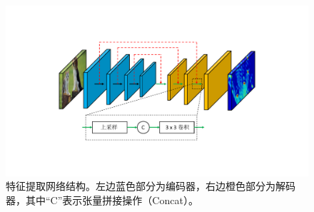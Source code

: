 \begin{figure}[t]
	\centering
	\includegraphics[trim={3cm, 3.5cm, 3cm, 3cm}, clip,width=\textwidth]{imgs/feature-extractor.pdf}
	\caption{特征提取网络结构。左边蓝色部分为编码器，右边橙色部分为解码器，其中“C”表示张量拼接操作（Concat）。}
	\label{fig:feature_extractor}
\end{figure}
